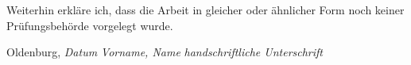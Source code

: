 \documentclass[11pt]{scrartcl}
\begin{document}
\vspace*{0.5cm} 

\raggedright
Weiterhin erkläre ich, dass die Arbeit in gleicher oder ähnlicher Form noch keiner Prüfungsbehörde vorgelegt wurde.


\vspace*{3cm} 
\noindent Oldenburg, \textit{Datum} 
\hspace*{6cm} \textit{Vorname, Name}
\hspace*{8cm} \textit{handschriftliche Unterschrift}

\end{document}
